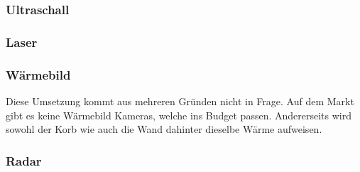 \subsubsection{Ultraschall}

\subsubsection{Laser}

\subsubsection{Wärmebild}
Diese Umsetzung kommt aus mehreren Gründen nicht in Frage. Auf dem Markt gibt es keine Wärmebild Kameras, welche ins Budget passen. Andererseits wird sowohl der Korb wie auch die Wand dahinter dieselbe Wärme aufweisen.

\subsubsection{Radar}